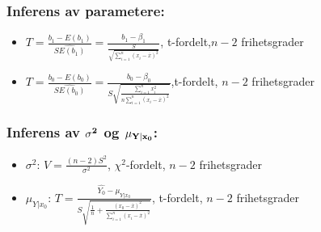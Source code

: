 \documentclass[12pt,a4paper,twocolumn,twoside]{article}
\begin{document}
\subsubsection*{Inferens av parametere:}
\begin{itemize}[topsep=0pt,itemsep=0pt, partopsep=0pt]
    \item $T=\frac{b_1-E(b_1)}{\hat{SE(b_1)}}=\frac{b_1-\beta_1}{\frac{S}{\sqrt{\sum_{i=1}^n(x_i-\overline{x})^2}}}$, t-fordelt,$n-2$ frihetsgrader
    \item $T=\frac{b_0-E(b_0)}{\hat{SE(b_0)}}=\frac{b_0-\beta_0}{S\sqrt{\frac{\sum_{i=1}^nx^2_i}{n\sum_{i=1}^n(x_i-\overline{x})^2}}}$,t-fordelt, $n-2$ frihetsgrader
\end{itemize}
\subsubsection*{Inferens av $\bold{\sigma^2}$ og $\bold{\mu_{Y|x_0}}$:}
\begin{itemize}[topsep=0pt,itemsep=0pt, partopsep=0pt]
    \item $\sigma^2$: $V=\frac{(n-2)S^2}{\sigma^2}$, $\chi^2$-fordelt, $n-2$ frihetsgrader
    \item $\mu_{Y|x_0}$: $T=\frac{\hat{Y_0}-\mu_{Y|x_0}}{S\sqrt{\frac{1}{n}+\frac{(x_0-\overline{x})^2}{\sum_{i=1}^n(x_i-\overline{x})^2}}}$, t-fordelt, $n-2$ frihetsgrader
\end{itemize}

%
%
\end{document}
